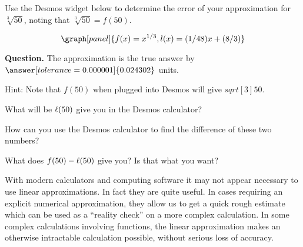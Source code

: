 \documentclass[handout,nooutcomes]{ximera}
\begin{document}
\begin{example}
\begin{explanation}
Use the Desmos widget below to determine the error of your approximation for $\sqrt[3]{50}$, noting that $\sqrt[3]{50} = f(50)$.

\[
\graph[panel]{f(x) = x^{1/3}, l(x) = (1/48) x + (8/3)}
\]

\textbf{Question. } The approximation is  the true 
answer by $\answer[tolerance=0.000001]{0.024302}$ units.

\begin{expandable}
Hint: Note that $f(50)$ when plugged into Desmos will give $sqrt[3]{50}$.
\begin{expandable}
What will be $\ell(50)$ give you in the Desmos calculator?
\begin{expandable}
How can you use the Desmos calculator to find the difference of these two numbers?
\begin{expandable}
What does $f(50)-\ell(50)$ give you? Is that what you want?
\end{expandable}
\end{expandable}
\end{expandable}
\end{expandable}

\end{explanation}
\end{example}

With modern calculators and computing software it may not appear
necessary to use linear approximations. In fact they are quite
useful. In cases requiring an explicit numerical approximation, they
allow us to get a quick rough estimate which can be used as a
``reality check'' on a more complex calculation. In some complex
calculations involving functions, the linear approximation makes an
otherwise intractable calculation possible, without serious loss of
accuracy.
\end{document}
